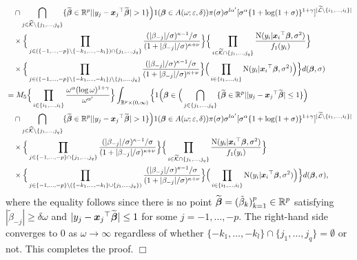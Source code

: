 \documentclass[12pt]{article}
\def\ep{{\varepsilon}}
\def\si{{\sigma}}
\def\al{{\alpha}}
\def\be{{\beta}}
\def\ga{{\gamma}}
\def\de{{\delta}}
\def\ep{{\varepsilon}}
\def\si{{\sigma}}
\def\om{{\omega}}
\def\non{{\nonumber}}
\def\Lc{{\cal L}}
\def\Kc{{\cal K}}
\def\al{{\alpha}}
\def\be{{\beta}}
\def\ga{{\gamma}}
\def\de{{\delta}}
\def\ep{{\varepsilon}}
\def\si{{\sigma}}
\def\om{{\omega}}
\def\ka{{\kappa}}
\def\bbe{{\text{\boldmath $\beta$}}}
\def\bet{{\tilde \be}}
\def\bbet{{\widetilde \bbe}}
\def\x{{\text{\boldmath $x$}}}
\def\Lc{{\cal L}}
\def\Kc{{\cal K}}
\def\non{{\nonumber}}
\begin{document}
\begin{align}
&\quad \cap \bigcap_{j \in \widehat{\Kc } \setminus \{ j_1 , \dots , j_q \} } \{ \bbet \in \mathbb{R} ^p | | y_j - {\x _j}^{\top } \bbet | > 1 \} \Big) 1( \bbe \in A( \om ; \ep , \de )) \pi ( \si ) \si ^{l {\al }'} [ \si ^{\al } \{ 1 + \log (1 + \si ) \} ^{1 + \ga } ]^{| \widetilde{\Lc } \setminus \{ i_1 , \dots , i_l \} |} \non \\
&\quad \times \Big\{ \prod_{j \in ( \{ - 1, \dots , - p \} \setminus \{ - k_1 , \dots , - k_l \} ) \cap \{ j_1 , \dots , j_q \} } {(| \be _{- j} | / \si )^{\ka - 1} / \si \over (1 + | \be _{- j} | / \si )^{\ka + \nu }} \Big\} \Big\{ \prod_{i \in \widetilde{\Kc } \cap \{ j_1 , \dots , j_q \} } {{\rm{N}} ( y_i | {\x _i}^{\top } \bbe , \si ^2 ) \over f_1 ( y_i )} \Big\} \non \\
&\quad \times \Big\{ \prod_{j \in ( \{ - 1, \dots , - p \} \setminus \{ - k_1 , \dots , - k_l \} ) \setminus \{ j_1 , \dots , j_q \} } {(| \be _{- j} | / \si )^{\ka - 1} / \si \over (1 + | \be _{- j} | / \si )^{\ka + \nu }} \Big\} \Big( \prod_{i \in \{ i_1 , \dots , i_l \} } {\rm{N}} ( y_i | {\x _i}^{\top } \bbe , \si ^2 ) \Big) \Big\} d( \bbe , \si ) \non \\
&= M_5 \Big\{ \prod_{i \in \{ i_1 , \dots , i_l \} } {\om ^{\al } ( \log \om )^{1 + \ga } \over \om ^{{\al }'}} \Big\} \int_{\mathbb{R} ^p \times (0, \infty )} \Big\{ 1 \Big( \bbe \in \Big( \bigcap_{j \in \{ j_1 , \dots , j_q \} } \{ \bbet \in \mathbb{R} ^p | | y_j - {\x _j}^{\top } \bbet | \le 1 \} \Big) \non \\
&\quad \cap \bigcap_{j \in \widehat{\Kc } \setminus \{ j_1 , \dots , j_q \} } \{ \bbet \in \mathbb{R} ^p | | y_j - {\x _j}^{\top } \bbet | > 1 \} \Big) 1( \bbe \in A( \om ; \ep , \de )) \pi ( \si ) \si ^{l {\al }'} [ \si ^{\al } \{ 1 + \log (1 + \si ) \} ^{1 + \ga } ]^{| \widetilde{\Lc } \setminus \{ i_1 , \dots , i_l \} |} \non \\
&\quad \times \Big\{ \prod_{j \in \{ - 1, \dots , - p \} \cap \{ j_1 , \dots , j_q \} } {(| \be _{- j} | / \si )^{\ka - 1} / \si \over (1 + | \be _{- j} | / \si )^{\ka + \nu }} \Big\} \Big\{ \prod_{i \in \widetilde{\Kc } \cap \{ j_1 , \dots , j_q \} } {{\rm{N}} ( y_i | {\x _i}^{\top } \bbe , \si ^2 ) \over f_1 ( y_i )} \Big\} \non \\
&\quad \times \Big\{ \prod_{j \in \{ - 1, \dots , - p \} \setminus ( \{ - k_1 , \dots , - k_l \} \cup \{ j_1 , \dots , j_q \} )} {(| \be _{- j} | / \si )^{\ka - 1} / \si \over (1 + | \be _{- j} | / \si )^{\ka + \nu }} \Big\} \Big( \prod_{i \in \{ i_1 , \dots , i_l \} } {\rm{N}} ( y_i | {\x _i}^{\top } \bbe , \si ^2 ) \Big) \Big\} d( \bbe , \si ) \text{,} \non 
\end{align}
where the equality follows since there is no point $\bbet = ( \bet _k )_{k = 1}^{p} \in \mathbb{R} ^p$ satisfying $| \bet _{- j} | \ge \de \om $ and $| y_j - {\x _j}^{\top } \bbet | \le 1$ for some $j = - 1, \dots , - p$. 
The right-hand side converges to $0$ as $\om \to \infty $ regardless of whether $\{ - k_1 , \dots , - k_l \} \cap \{ j_1 , \dots , j_q \} = \emptyset $ or not. 
This completes the proof. 
\hfill$\Box$
\end{document}
